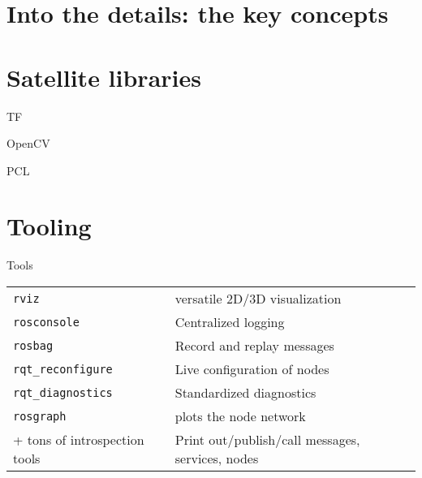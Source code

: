 \documentclass[compress]{beamer}
\begin{document}

\begin{frame}[containsverbatim]{}


\end{frame}


\begin{frame}{}
\end{frame}


\section{Into the details: the key concepts}

\section{Satellite libraries}

\begin{frame}{TF}
\end{frame}

\begin{frame}{OpenCV}
\end{frame}

\begin{frame}{PCL}
\end{frame}


\section{Tooling}

\begin{frame}{Tools}
    \begin{table}[]
        \begin{tabularx}{\linewidth}{l>{\raggedright}X}
            \toprule
            \texttt{rviz} & versatile 2D/3D visualization \tabularnewline
            \texttt{rosconsole} & Centralized logging \tabularnewline
            \texttt{rosbag} & Record and replay messages \tabularnewline
            \texttt{rqt\_reconfigure} & Live configuration of nodes \tabularnewline
            \texttt{rqt\_diagnostics} & Standardized diagnostics \tabularnewline
            \texttt{rosgraph} & plots the node network \tabularnewline
            + tons of introspection tools & Print out/publish/call messages, services, nodes \tabularnewline
            \bottomrule
        \end{tabularx}
        \label{tab:options}
    \end{table}
\end{frame}
\end{document}
